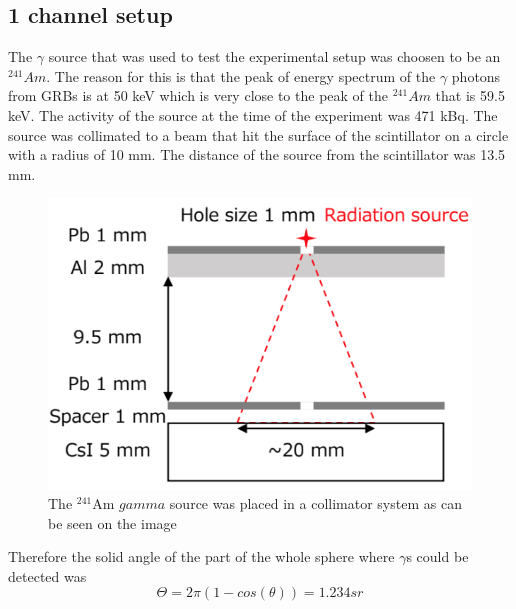 \documentclass[12pt, a4paper,titlepage]{article}
\numberwithin{equation}{section}
\numberwithin{figure}{section}
\begin{document}
  

\pagebreak

\subsection{1 channel setup}

The $\gamma$ source that was used to test the experimental setup was choosen to be an $^{241}Am$. The reason for this is that the peak of energy spectrum of the $\gamma$ photons from GRBs is at 50 keV which is very close to the peak of the $^{241}Am$ that is 59.5 keV. The activity of the source at the time of the experiment was 471 kBq. The source was collimated to a beam that hit the surface of the scintillator on a circle with a radius of 10 mm. The distance of the source from the scintillator was 13.5 mm. 

\begin{figure}[h!]
\includegraphics[width=150.0mm]{images/irradiation.png}
\caption{The $^{241}$Am $gamma$ source was placed in a collimator system as can be seen on the image}
\end{figure}

Therefore the solid angle of the part of the whole sphere where $\gamma$s could be detected was 
$$\Theta = 2 \pi (1-cos(\theta)) = 1.234 sr$$
\end{document}
